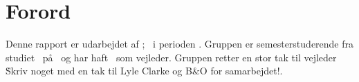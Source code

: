 \chapter*{Forord}
\label{Forord}
Denne rapport er udarbejdet af \groupname; \groupmembers\ i perioden \projectperiod. Gruppen er \semester semesterstuderende fra studiet \studyname\ på \universityname\ og har haft \supervisor\ som vejleder. Gruppen retter en stor tak til vejleder \supervisor\.
 Skriv noget med en tak til Lyle Clarke og B$\&$O for samarbejdet!.
%
